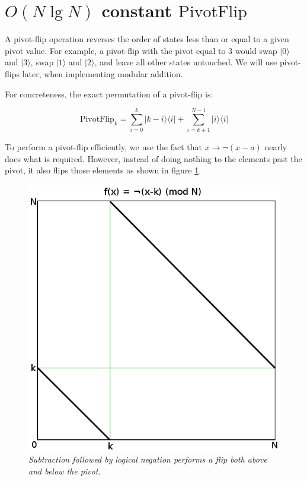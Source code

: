 \documentclass[twocolumn]{article}
\begin{document}
\section{$O(N \lg N)$ constant $\text{PivotFlip}$}

A pivot-flip operation reverses the order of states less than or equal to a given pivot value.
For example, a pivot-flip with the pivot equal to 3 would swap $|0\rangle$ and $|3\rangle$, swap $|1\rangle$ and $|2\rangle$, and leave all other states untouched.
We will use pivot-flips later, when implementing modular addition.

For concreteness, the exact permutation of a pivot-flip is:

$$\text{PivotFlip}_k = \sum_{i=0}^k |k-i\rangle \langle i| + \sum_{i=k+1}^{N-1} |i\rangle \langle i|$$

To perform a pivot-flip efficiently, we use the fact that $x \rightarrow \lnot(x - a)$ nearly does what is required.
However, instead of doing nothing to the elements past the pivot, it also flips those elements as shown in figure \ref{fig:double-flip}.

\begin{figure}
  \centering
  \includegraphics[totalheight=7cm]{double-flip.png}
  \caption{\em Subtraction followed by logical negation performs a flip both above and below the pivot.}
  \label{fig:double-flip}
\end{figure}
\end{document}
